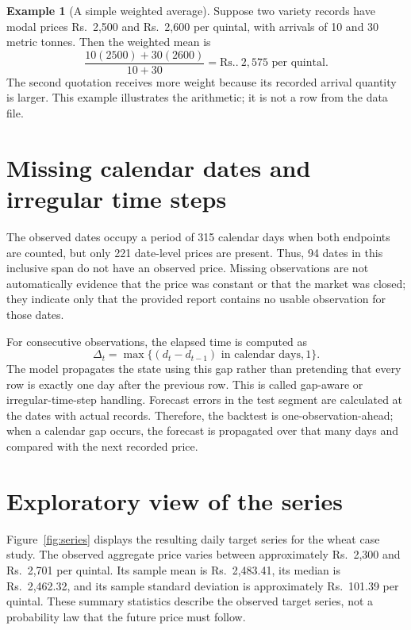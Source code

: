 \documentclass[12pt,a4paper,oneside]{report}
\numberwithin{equation}{chapter}
\numberwithin{figure}{chapter}
\numberwithin{table}{chapter}
\theoremstyle{definition}
\newtheorem{example}{Example}[chapter]
\theoremstyle{plain}
\newcommand{\1}{\mathbf{1}}
\newcommand{\Rs}{\text{Rs.}}
\begin{document}
\begin{example}[A simple weighted average]
Suppose two variety records have modal prices Rs.\ 2,500 and Rs.\ 2,600 per quintal, with arrivals of 10 and 30 metric tonnes. Then the weighted mean is
\[
 \frac{10(2500)+30(2600)}{10+30}=\Rs.\ 2,575\text{ per quintal}.
\]
The second quotation receives more weight because its recorded arrival quantity is larger. This example illustrates the arithmetic; it is not a row from the data file.
\end{example}

\section{Missing calendar dates and irregular time steps}
The observed dates occupy a period of 315 calendar days when both endpoints are counted, but only 221 date-level prices are present. Thus, 94 dates in this inclusive span do not have an observed price. Missing observations are not automatically evidence that the price was constant or that the market was closed; they indicate only that the provided report contains no usable observation for those dates.

For consecutive observations, the elapsed time is computed as
\begin{equation}
  \Delta_t=\max\{(d_t-d_{t-1})\text{ in calendar days},1\}.
  \label{eq:dt}
\end{equation}
The model propagates the state using this gap rather than pretending that every row is exactly one day after the previous row. This is called gap-aware or irregular-time-step handling. Forecast errors in the test segment are calculated at the dates with actual records. Therefore, the backtest is one-observation-ahead; when a calendar gap occurs, the forecast is propagated over that many days and compared with the next recorded price.

\section{Exploratory view of the series}
Figure~\ref{fig:series} displays the resulting daily target series for the wheat case study. The observed aggregate price varies between approximately Rs.\ 2,300 and Rs.\ 2,701 per quintal. Its sample mean is Rs.\ 2,483.41, its median is Rs.\ 2,462.32, and its sample standard deviation is approximately Rs.\ 101.39 per quintal. These summary statistics describe the observed target series, not a probability law that the future price must follow.
\end{document}
